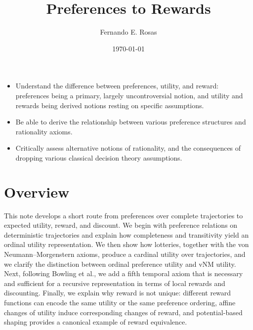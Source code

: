 \documentclass[11pt]{article}
\title{Preferences to Rewards}
\author{Fernando E. Rosas}
\date{\today}
\begin{document}
\maketitle


\begin{learningoutcomes}
  \begin{itemize}
    \item Understand the difference between preferences, utility, and reward:
      preferences being a primary, largely uncontroversial notion, and utility
      and rewards being derived notions resting on specific assumptions.
    \item Be able to derive the relationship between various preference
      structures and rationality axioms.
    \item Critically assess alternative notions of rationality, and the
      consequences of dropping various classical decision theory assumptions.
  \end{itemize}
\end{learningoutcomes}

\section*{Overview}
This note develops a short route from preferences over complete trajectories to
expected utility, reward, and discount. We begin with preference relations on
deterministic trajectories and explain how completeness and transitivity yield
an ordinal utility representation. We then show how lotteries, together with
the von Neumann--Morgenstern axioms, produce a cardinal utility over
trajectories, and we clarify the distinction between ordinal preference utility
and vNM utility. Next, following Bowling et al., we add a fifth temporal axiom
that is necessary and sufficient for a recursive representation in terms of
local rewards and discounting. Finally, we explain why reward is not unique:
different reward functions can encode the same utility or the same preference
ordering, affine changes of utility induce corresponding changes of reward, and
potential-based shaping provides a canonical example of reward equivalence.
\end{document}
